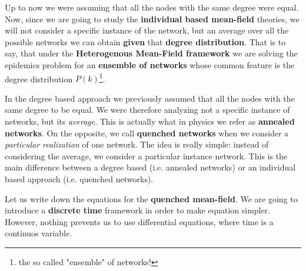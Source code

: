 \documentclass[../main/main.tex]{subfiles}
\begin{document}
Up to now we were assuming that all the nodes with the same degree were equal. Now, since we are going to study the \textbf{individual based mean-field} theories, we will not consider a specific instance of the network, but an average over all the possible networks we can obtain \textbf{given} that \textbf{degree distribution}.
That is to say, that under the \textbf{Heterogenous Mean-Field framework} we are solving the epidemics problem for an \textbf{ensemble of networks} whose common feature is the degree distribution \( P(k) \)\footnote{the so called "ensemble" of networks!}.

In the degree based approach we previously assumed that all the nodes with the same degree to be equal. We were therefore analyzing not a specific instance of networks, but its \textit{average}. This is actually what in physics we refer as \textbf{annealed networks}.
On the opposite, we call \textbf{quenched networks} when we consider a \textit{particular realization} of one network. The idea is really simple: instead of considering the average, we consider a particular instance network. This is the main difference between a degree based (i.e. annealed networks) or an individual based approach (i.e. quenched networks).



Let us write down the equations for the \textbf{quenched mean-field}. We are going to introduce a \textbf{discrete time} framework in order to make equation simpler. However, nothing prevents us to use differential equations, where time is a continuos variable.
\end{document}
